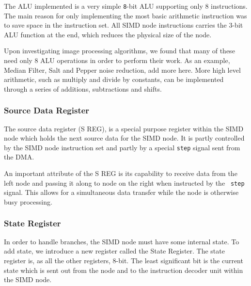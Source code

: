
The \ac{ALU} implemented is a very simple {\tt 8}-bit \ac{ALU} supporting only 8
instructions. The main reason for only implementing the most basic arithmetic
instruction was to save space in the instruction set. All \ac{SIMD} node
instructions carries the 3-bit \ac{ALU} function at the end, which reduces the
physical size of the node.


Upon investigating image processing algorithms, we found that many of these need
only 8 \ac{ALU} operations in order to perform their work. As an example, Median
Filter, Salt and Pepper noise reduction, {\color{red} add more here}. More high
level arithmetic, such as multiply and divide by constants, can be implemented
through a series of additions, subtractions and shifts. 

\subsubsection{Source Data Register}
The source data register (S REG), is a special purpose register within the
\ac{SIMD} node which holds the next source data for the \ac{SIMD} node. It is
partly controlled by the \ac{SIMD} node instruction set and partly by a special
{\tt step} signal sent from the \ac{DMA}. 

An important attribute of the S REG is its capability to receive data from the
left node and passing it along to node on the right when instructed by the {\tt
  step} signal. This allows for a simultaneous data transfer while the node is
otherwise busy processing.

\subsubsection{State Register}
In order to handle branches, the \ac{SIMD} node must have some internal
state. To add state, we introduce a new register called the State Register. The
state register is, as all the other registers, 8-bit. The least significant bit
is the current state which is sent out from the node and to the instruction
decoder unit within the \ac{SIMD} node.

